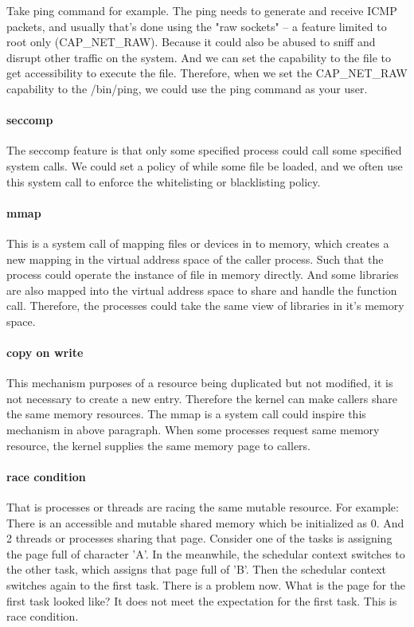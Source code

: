 \documentclass[12pt,a4paper]{article}
\begin{document}
Take ping command for example. The ping needs to generate and receive ICMP packets,
and usually that's done using the "raw sockets" – a feature limited to root only
(CAP\_NET\_RAW). Because it could also be abused to sniff and disrupt other traffic
on the system. And we can set the capability to the file to get accessibility to
execute the file.
Therefore, when we set the CAP\_NET\_RAW capability to the /bin/ping, we could use
the ping command as your user.

\paragraph{seccomp}
The seccomp feature is that only some specified process could call some specified
system calls. We could set a policy of while some file be loaded, and we often use
this system call to enforce the whitelisting or blacklisting policy.

\paragraph{mmap}
This is a system call of mapping files or devices in to memory, which creates a
new mapping in the virtual address space of the caller process. Such that
the process could operate the instance of file in memory directly.
And some libraries are also mapped into the virtual address space to share and handle
the function call. Therefore, the processes could take the same view of libraries in
it's memory space.

\paragraph{copy on write}
This mechanism purposes of a resource being duplicated but not modified, it is not
necessary to create a new entry. Therefore the kernel can make callers share
the same memory resources. The mmap is a system call could inspire this mechanism
in above paragraph. When some processes request same memory resource, the kernel
supplies the same memory page to callers.

\paragraph{race condition}
That is processes or threads are racing the same mutable resource. For example:
There is an accessible and mutable shared memory which be initialized as 0. And
2 threads or processes sharing that page. Consider one of the tasks is assigning
the page full of character 'A'. In the meanwhile, the schedular context switches to
the other task, which assigns that page full of 'B'. Then the schedular context switches
again to the first task. There is a problem now. What is the page for the first
task looked like? It does not meet the expectation for the first task.
This is race condition.
\end{document}
